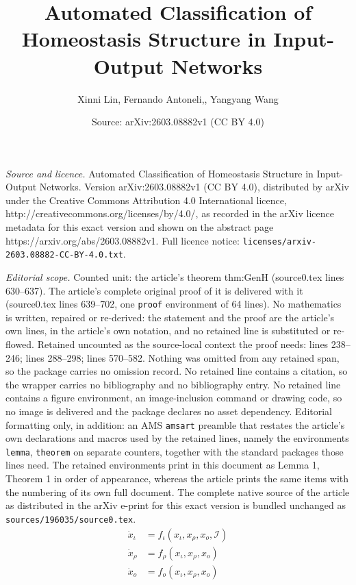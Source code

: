 \documentclass[10pt,a4paper]{amsart}
\title{Automated Classification of Homeostasis Structure in Input-Output Networks}
\author{Xinni Lin, Fernando Antoneli,, Yangyang Wang}
\date{Source: arXiv:2603.08882v1 (CC BY 4.0)}
\newcommand{\II}{{\mathcal I}}
\begin{document}
\maketitle

\noindent\emph{Source and licence.} Automated Classification of Homeostasis Structure in Input-Output Networks. Version arXiv:2603.08882v1 (CC BY 4.0), distributed by arXiv under the Creative Commons Attribution 4.0 International licence, http://creativecommons.org/licenses/by/4.0/, as recorded in the arXiv licence metadata for this exact version and shown on the abstract page https://arxiv.org/abs/2603.08882v1. Full licence notice: \texttt{licenses/arxiv-2603.08882-CC-BY-4.0.txt}.\par\smallskip

\noindent\textit{Editorial scope.} Counted unit: the article's theorem thm:GenH (source0.tex lines 630--637). The article's complete original proof of it is delivered with it (source0.tex lines 639--702, one \texttt{proof} environment of 64 lines). No mathematics is written, repaired or re-derived: the statement and the proof are the article's own lines, in the article's own notation, and no retained line is substituted or re-flowed.  Retained uncounted as the source-local context the proof needs: lines 238--246; lines 288--298; lines 570--582.  Nothing was omitted from any retained span, so the package carries no omission record.  No retained line contains a citation, so the wrapper carries no bibliography and no bibliography entry.  No retained line contains a figure environment, an image-inclusion command or drawing code, so no image is delivered and the package declares no asset dependency.  Editorial formatting only, in addition: an AMS \texttt{amsart} preamble that restates the article's own declarations and macros used by the retained lines, namely the environments \texttt{lemma}, \texttt{theorem} on separate counters, together with the standard packages those lines need.  The retained environments print in this document as Lemma 1, Theorem 1 in order of appearance, whereas the article prints the same items with the numbering of its own full document.  The complete native source of the article as distributed in the arXiv e-print for this exact version is bundled unchanged as \texttt{sources/196035/source0.tex}.
\begin{equation} \label{eq: io}
\begin{split}
\dot{x}_\iota & = 
f_\iota(x_\iota,x_\rho, x_o,\II) \\
\dot{x}_\rho & =
f_\rho(x_\iota,x_\rho,x_o) \\
\dot{x}_o & = f_o(x_\iota,x_\rho,x_o)
\end{split}
\end{equation}
\end{document}
